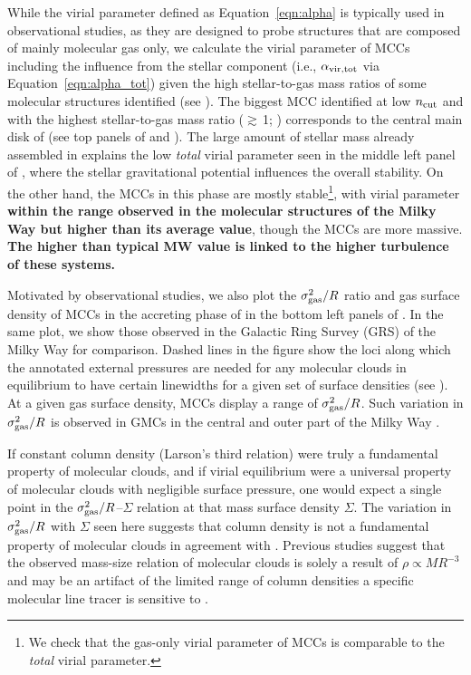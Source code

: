 \IfFileExists{emulateapjlegacy.cls}{\documentclass[iop]{emulateapjlegacy}}{\documentclass[iop]{emulateapj}}
\begin{document}
While the virial parameter defined as Equation~\ref{eqn:alpha} is typically used in observational studies, as they are designed to probe structures that are composed of mainly molecular gas only, we calculate the virial parameter of MCCs including the influence from the stellar component (i.e., $\alpha_{\rm vir, tot}$ via Equation~\ref{eqn:alpha_tot}) given the high stellar-to-gas mass ratios of some molecular structures identified (see ).
%
The biggest MCC identified at low $n_{\rm cut}$ and with the highest stellar-to-gas mass ratio ($\gtrsim$\,1; ) corresponds to the central main disk of \flower (see top panels of  and ). The large amount of stellar mass already assembled in \flower explains the low {\em total} virial parameter seen in the middle left panel of , where the stellar gravitational potential influences the overall stability. On the other hand, the MCCs in this phase are mostly stable\footnote{We check that the gas-only virial parameter of MCCs is comparable to the {\em total} virial parameter.}, with virial parameter {\bf within the range observed in the molecular structures
of the Milky Way but higher than its average value}, though the MCCs are more massive. {\bf The higher than typical MW value is linked to the higher turbulence of these systems.}

Motivated by observational studies, we also plot the $\sigma_{\rm gas}^2/R$ ratio and gas surface density of MCCs in the accreting phase of \flower in the bottom left panels of . In the same plot, we show those observed in the Galactic Ring Survey (GRS) of the Milky Way \citep{Heyer09a} for comparison. Dashed lines in the figure show the loci along which the annotated external pressures are needed for any molecular clouds in equilibrium to have certain linewidths for a given set of surface densities (see ).
At a given gas surface density, MCCs display a range of $\sigma_{\rm gas}^2/R$.
Such variation in $\sigma_{\rm gas}^2/R$ is observed in GMCs in the central and outer part of the Milky Way \citep{Oka01a, Heyer09a}.

If constant column density (Larson's third relation) were truly a
fundamental property of molecular clouds,
and if virial equilibrium were a universal property of molecular clouds with negligible surface pressure, one would expect a single point in the $\sigma_{\rm gas}^2/R$--$\Sigma$ relation at that
mass surface density $\Sigma$.
The variation in $\sigma_{\rm gas}^2/R$ with $\Sigma$ seen here suggests that column density is not a fundamental property of
molecular clouds in agreement with \citet{Heyer09a}.
Previous studies suggest that the observed mass-size relation of molecular clouds
is solely a result of $\rho\propto M R^{-3}$ and may be an artifact of the limited range of
column densities a specific molecular line tracer is sensitive to \citep[see e.g.,][]{Ballesteros02a, Ballesteros11a}.
\end{document}
